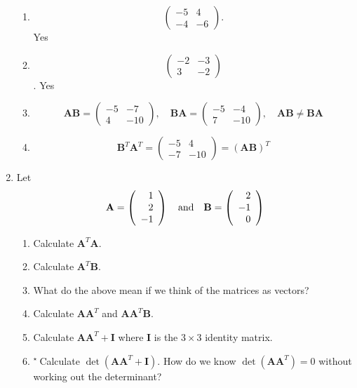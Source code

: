 \documentclass[11pt,a4paper]{article}
\def\bA{\mathbf{A}}
\def\bB{\mathbf{B}}
\def\bI{\mathbf{I}}
\def\tough{$\!\!\!{}^\star\>$}
\begin{document}
\begin{enumerate}
{\begin{enumerate}
	\item\[\left(
\begin{array}{cc}
 -5 & 4 \\
 -4 & -6
\end{array}
\right).\]
Yes
\item 
\[\left(
\begin{array}{cc}
 -2 & -3 \\
 3 & -2
\end{array}
\right)\]. Yes
\item 
\[ \bA \bB = \left(
\begin{array}{cc}
 -5 & -7 \\
 4 & -10
\end{array}
\right), \quad \bB\bA= \left(
\begin{array}{cc}
 -5 & -4 \\
 7 & -10
\end{array}
\right),\quad \bA \bB \ne \bB \bA \]
\item \[\bB^T \bA^T=\left(
\begin{array}{cc}
 -5 & 4 \\
 -7 & -10
\end{array}
\right)= (\bA \bB)^T\]
\end{enumerate}


\noindent\hrulefill

}{}%



\item\label{qwrblm1}
Let 
\[ \bA =  \left( \begin{array}{r} 1 \\ 2 \\ -1 \end{array} \right) \quad
\hbox{and} \quad
\bB =  \left( \begin{array}{r} 2 \\ -1 \\ 0 \end{array} \right)
\] 
\begin{enumerate}
	\item Calculate $\bA^T \bA$.
	\item Calculate $\bA^T \bB$.
	\item What do the above mean if we think of the matrices as vectors?
	\item Calculate $\bA \bA^T$ and $\bA \bA^T \bB$.
	\item Calculate $\bA \bA^T + \bI$ where $\bI$ is the $3\times 3 $ identity matrix.
	\item\tough Calculate $\det\left(\bA \bA^T + \bI\right)$. How do we know $\det\left(\bA \bA^T\right)=0$ without working out the determinant?
	\end{enumerate}


\end{enumerate}
\end{document}
